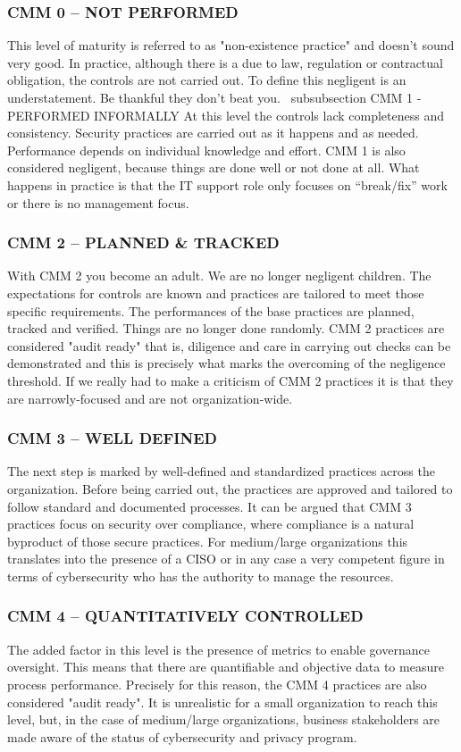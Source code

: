 \subsubsection{CMM 0 – NOT PERFORMED}
This level of maturity is referred to as "non-existence practice" and doesn't sound very good. In practice, although there is a due to law, regulation or contractual obligation, the controls are not carried out. To define this negligent is an understatement. Be thankful they don't beat you.
\ subsubsection {CMM 1 - PERFORMED INFORMALLY}
At this level the controls lack completeness and consistency. Security practices are carried out as it happens and as needed. Performance depends on individual knowledge and effort. CMM 1 is also considered negligent, because things are done well or not done at all. What happens in practice is that the IT support role only focuses on “break/fix” work or there is no management focus.
\subsubsection{CMM 2 – PLANNED \& TRACKED}
With CMM 2 you become an adult. We are no longer negligent children. The expectations for controls are known and practices are tailored to meet those specific requirements. The performances of the base practices are planned, tracked and verified. Things are no longer done randomly. CMM 2 practices are considered "audit ready" that is, diligence and care in carrying out checks can be demonstrated and this is precisely what marks the overcoming of the negligence threshold. If we really had to make a criticism of CMM 2 practices it is that they are narrowly-focused and are not organization-wide.
\subsubsection{CMM 3 – WELL DEFINED}
The next step is marked by well-defined and standardized practices across the organization. Before being carried out, the practices are approved and tailored to follow standard and documented processes. It can be argued that CMM 3 practices focus on security over compliance, where compliance is a natural byproduct of those secure practices. For medium/large organizations this translates into the presence of a CISO or in any case a very competent figure in terms of cybersecurity who has the authority to manage the resources.
\subsubsection{CMM 4 – QUANTITATIVELY CONTROLLED}
The added factor in this level is the presence of metrics to enable governance oversight. This means that there are quantifiable and objective data to measure process performance. Precisely for this reason, the CMM 4 practices are also considered "audit ready". It is unrealistic for a small organization to reach this level, but, in the case of medium/large organizations, business stakeholders are made aware of the status of cybersecurity and privacy program. 
